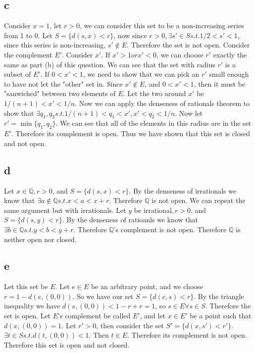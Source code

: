\documentclass[12pt]{article}
\newcommand{\Q}{\mathbb{Q}}
\begin{document}
\subsection{c}
Consider $x = 1$, let $r > 0$, we can consider this set to be a non-increasing series from 1 to 0. Let $S = \{d(s,x)<r\}$, now since $r > 0, \exists s' \in S s.t. 1/2<s'<1$, since this series is non-increasing, $s' \notin E$. Therefore the set is not open.
\newline
Consider the complement $E'$. Consider $x'$. If $x'>1 or x'<0$, we can choose $r'$ exactly the same as part (b) of this question. We can see that the set with radius $r'$ is a subset of $E'$.
\newline
If $0<x'<1$, we need to show that we can pick an $r'$ small enough to have not let the "other" set in.
\newline
Since $x' \notin E$, and $0<x'<1$, then it must be "sanwiched" between two elements of $E$. Let the two around $x'$ be $1/(n+1)<x'<1/n$. Now we can apply the denseness of rationals theorem to show that $\exists q_1, q_2 s.t. 1/(n+1)<q_1<x', x'<q_2<1/n$. Now let $r' = \min \{ q_1, q_2 \}$. We can see that all of the elements in this radius are in the set $E'$. Therefore its complement is open.
\newline
Thus we have shown that this set is closed and not open.

\subsection{d}
Let $x \in \Q, r>0$, and $S = \{d(s,x)<r\}$. By the denseness of irrationals we know that $\exists a \notin \Q s.t. x < a < x+r$. Therefore $\Q$ is not open.
\newline
We can repeat the same argument but with irrationals. Let $y$ be irrational$, r>0$, and $S = \{d(s,y)<r\}$. By the denseness of ratioanls we know that $\exists b \in \Q s.t. y < b < y+r$. Therefore $\Q$'s complement is not open.
\newline
Therefore $\Q$ is neither open nor closed.

\subsection{e}
Let this set be $E$. Let $e \in E$ be an arbitrary point, and we choose $r = 1-d(e,(0,0))$. So we have our set $S = \{d(e,s)<r\}$.
By the triangle inequality we have $d(s, (0,0)) < 1 - r +r = 1$, so $s \in E \forall s \in S$. Therefore the set is open.
\newline
Let $E$'s complement be called $E'$, and let $x \in E'$ be a point such that $d(x, (0,0)) = 1$. Let $r' > 0$, then consider the set $S' = \{d(x,s')<r'\}$. $\exists t \in S s.t. d(t, (0,0))<1$. Then $t \in E$. Therefore its complement is not open.
\newline
Therefore this set is open and not closed.
\newpage
\end{document}
